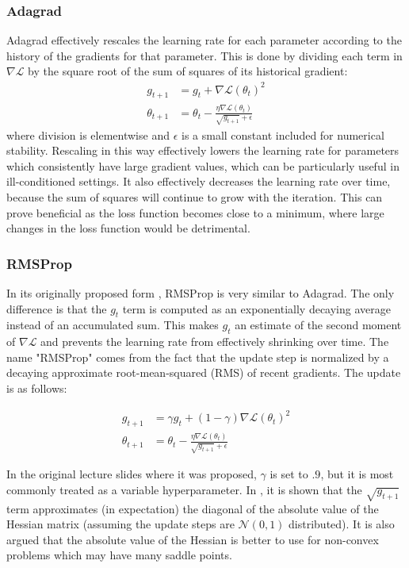 \subsubsection{Adagrad}

Adagrad \cite{duchi2011adaptive} effectively rescales the learning rate for each parameter according to the history of the gradients for that parameter.
This is done by dividing each term in $\nabla \mathcal{L}$ by the square root of the sum of squares of its historical gradient:
\begin{align}
g_{t + 1} &= g_t + \nabla \mathcal{L}(\theta_t)^2 \\
\theta_{t + 1} &= \theta_t - \frac{\eta\nabla \mathcal{L}(\theta_t)}{\sqrt{g_{t + 1}} + \epsilon}
\end{align}
where division is elementwise and $\epsilon$ is a small constant included for numerical stability.
Rescaling in this way effectively lowers the learning rate for parameters which consistently have large gradient values, which can be particularly useful in ill-conditioned settings.
It also effectively decreases the learning rate over time, because the sum of squares will continue to grow with the iteration.
This can prove beneficial as the loss function becomes close to a minimum, where large changes in the loss function would be detrimental.

\subsubsection{RMSProp}
\label{sec:rmsprop}

In its originally proposed form \cite{tieleman2012lecture}, RMSProp is very similar to Adagrad.
The only difference is that the $g_t$ term is computed as an exponentially decaying average instead of an accumulated sum.
This makes $g_t$ an estimate of the second moment of $\nabla \mathcal{L}$ and prevents the learning rate from effectively shrinking over time.
The name "RMSProp" comes from the fact that the update step is normalized by a decaying approximate root-mean-squared (RMS) of recent gradients.
The update is as follows:

\begin{align}
g_{t + 1} &= \gamma g_t + (1 - \gamma) \nabla \mathcal{L}(\theta_t)^2 \\
\theta_{t + 1} &= \theta_t - \frac{\eta\nabla \mathcal{L}(\theta_t)}{\sqrt{g_{t + 1}} + \epsilon}
\end{align}

In the original lecture slides where it was proposed, $\gamma$ is set to $.9$, but it is most commonly treated as a variable hyperparameter.
In \cite{dauphin2015rmsprop}, it is shown that the $\sqrt{g_{t + 1}}$ term approximates (in expectation) the diagonal of the absolute value of the Hessian matrix (assuming the update steps are $\mathcal{N}(0, 1)$ distributed).
It is also argued that the absolute value of the Hessian is better to use for non-convex problems which may have many saddle points.

